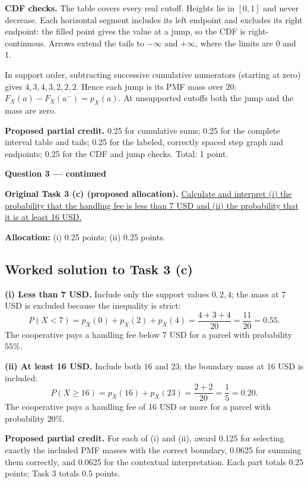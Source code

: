 \textbf{CDF checks.} The table covers every real cutoff. Heights lie in $[0,1]$ and never decrease. Each horizontal segment includes its left endpoint and excludes its right endpoint: the filled point gives the value at a jump, so the CDF is right-continuous. Arrows extend the tails to $-\infty$ and $+\infty$, where the limits are 0 and 1.

In support order, subtracting successive cumulative numerators (starting at zero) gives $4,3,4,3,2,2,2$. Hence each jump is its PMF mass over $20$: $F_X(a)-F_X(a^-)=p_X(a)$. At unsupported cutoffs both the jump and the mass are zero.

\textbf{Proposed partial credit.} 0.25 for cumulative sums; 0.25 for the complete interval table and tails; 0.25 for the labeled, correctly spaced step graph and endpoints; 0.25 for the CDF and jump checks. Total: 1 point.

\par\vspace{3mm}\secInicio[][sec:q3]

\clearpage
\textbf{Question 3 --- continued}

\textbf{Original Task 3 (c) (proposed allocation).} \hyperref[sol:q3t3]{Calculate and interpret (i) the probability that the handling fee is less than 7 USD and (ii) the probability that it is at least 16 USD.} 

\textbf{Allocation:} (i) 0.25 points; (ii) 0.25 points.

\subsection*{Worked solution to Task 3 (c) }
\label{sol:q3t3}

\textbf{(i) Less than 7 USD.} Include only the support values $0,2,4$; the mass at 7 USD is excluded because the inequality is strict:
\[
P(X<7)=p_X(0)+p_X(2)+p_X(4)
=\frac{4+3+4}{20}=\frac{11}{20}=0.55.
\]
The cooperative pays a handling fee below 7 USD for a parcel with probability $55\%$.

\textbf{(ii) At least 16 USD.} Include both $16$ and $23$; the boundary mass at 16 USD is included:
\[
P(X\geq16)=p_X(16)+p_X(23)=\frac{2+2}{20}=\frac15=0.20.
\]
The cooperative pays a handling fee of 16 USD or more for a parcel with probability $20\%$.

\textbf{Proposed partial credit.} For each of (i) and (ii), award 0.125 for selecting exactly the included PMF masses with the correct boundary, 0.0625 for summing them correctly, and 0.0625 for the contextual interpretation. Each part totals 0.25 points; Task 3 totals 0.5 points.

